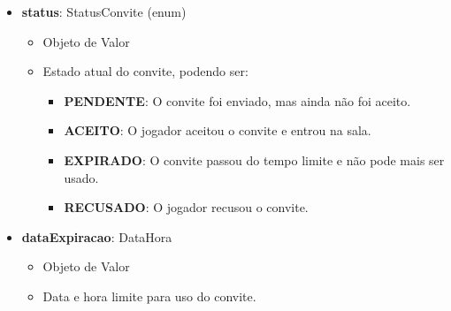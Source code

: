 \begin{itemize}
        \item \textbf{status}: StatusConvite (enum)  
              \begin{itemize}
                  \item Objeto de Valor
                  \item Estado atual do convite, podendo ser:
                  \begin{itemize}
                      \item \textbf{PENDENTE}: O convite foi enviado, mas ainda não foi aceito.
                      \item \textbf{ACEITO}: O jogador aceitou o convite e entrou na sala.
                      \item \textbf{EXPIRADO}: O convite passou do tempo limite e não pode mais ser usado.
                      \item \textbf{RECUSADO}: O jogador recusou o convite.
                  \end{itemize}
              \end{itemize}
    
        \item \textbf{dataExpiracao}: DataHora  
              \begin{itemize}
                  \item Objeto de Valor
                  \item Data e hora limite para uso do convite.
              \end{itemize}
    \end{itemize}
